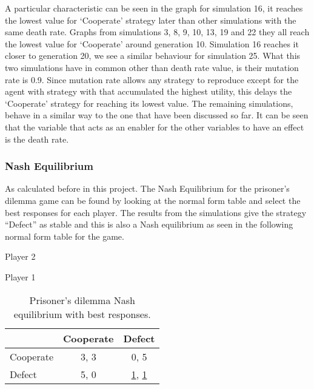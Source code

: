 A particular characteristic can be seen in the graph for simulation 16, it reaches the lowest value for `Cooperate' strategy later than other simulations with the same death rate. Graphs from simulations 3, 8, 9, 10, 13, 19 and 22 they all reach the lowest value for `Cooperate' around generation 10. Simulation 16 reaches it closer to generation 20, we see a similar behaviour for simulation 25. What this two simulations have in common other than death rate value, is their mutation rate is 0.9. Since mutation rate allows any strategy to reproduce except for the agent with strategy with that accumulated the highest utility, this delays the `Cooperate' strategy for reaching its lowest value.		  
The remaining simulations, behave in a similar way to the one that have been discussed  so far. It can be seen that the variable that acts as an enabler for the other variables to have an effect is the death rate. 

\subsubsection{Nash Equilibrium}
As calculated before in this project. The Nash Equilibrium for the prisoner's dilemma game can be found by looking at the normal form table and select the best responses for each player. The results from the simulations give the strategy ``Defect'' as stable and this is also a Nash equilibrium as seen in the following normal form table for the game.

\begin{table}[H]
\begin{center}
Player 2

Player 1
\begin{tabular}{|l|c|c|}
\hline
 & Cooperate & Defect\\ 
\hline
Cooperate & 3, 3 & 0, 5\\
\hline
Defect & 5, 0 & \underline{1}, \underline{1}\\
\hline
\end{tabular}

\caption{ Prisoner's dilemma Nash equilibrium with best responses.}
\label{fig:pdnashbr}	
\end{center}
\end{table}


